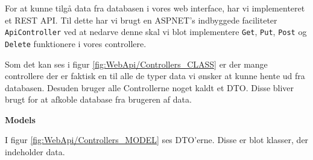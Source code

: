 For at kunne tilgå data fra databasen i vores web interface, har vi implementeret et \gls{REST} \gls{API}. Til dette har vi brugt en \gls{ASPNET}'s indbyggede faciliteter \texttt{ApiController} ved at nedarve denne skal vi blot implementere \texttt{Get}, \texttt{Put}, \texttt{Post} og \texttt{Delete} funktionere i vores controllere\cite{gh:webapi2}.


Som det kan ses i figur \ref{fig:WebApi/Controllers_CLASS} er der mange controllere der er faktisk en til alle de typer data vi ønsker at kunne hente ud fra databasen. Desuden bruger alle Controllerne noget kaldt et \gls{DTO}. Disse bliver brugt for at afkoble database fra brugeren af data.
\newline

\textbf{Models}

I figur \ref{fig:WebApi/Controllers_MODEL} ses \gls{DTO}'erne. Disse er blot klasser, der indeholder data.

